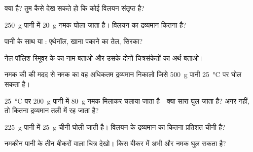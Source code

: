 \begin{exercise}[$\star$]\label{exo:g6:solutions-and-solubility:2}
 क्या है? तुम कैसे देख सकते हो कि कोई विलयन
संतृप्त है?
\end{exercise}

\begin{exercise}[$\star$]\label{exo:g6:solutions-and-solubility:3}
\qty{250}{g} पानी में \qty{20}{g} नमक घोला जाता है। विलयन का
द्रव्यमान कितना है?
\end{exercise}

\begin{exercise}[$\star$]\label{exo:g6:solutions-and-solubility:4}
पानी के साथ  या : एथेनॉल, खाना पकाने का तेल, सिरका?
\end{exercise}

\begin{exercise}[$\star$]\label{exo:g6:solutions-and-solubility:5}
नेल पॉलिश रिमूवर के  का नाम बताओ और उसके दोनों चित्रसंकेतों का
अर्थ बताओ।
\end{exercise}

\begin{exercise}[$\star\star$]\label{exo:g6:solutions-and-solubility:6}
नमक की  की मदद से नमक का वह अधिकतम द्रव्यमान निकालो जिसे
\qty{500}{g} पानी \qty{25}{\celsius} पर घोल सकता है।
\end{exercise}

\begin{exercise}[$\star\star$]\label{exo:g6:solutions-and-solubility:7}
\qty{25}{\celsius} पर \qty{200}{g} पानी में \qty{80}{g} नमक मिलाकर
चलाया जाता है। क्या सारा घुल जाता है? अगर नहीं, तो कितना द्रव्यमान तली में
रह जाता है?
\end{exercise}

\begin{exercise}[$\star\star$]\label{exo:g6:solutions-and-solubility:8}
\qty{225}{g} पानी में \qty{25}{g} चीनी घोली जाती है। विलयन के
द्रव्यमान का कितना प्रतिशत चीनी है?
\end{exercise}

\begin{exercise}[$\star\star$]\label{exo:g6:solutions-and-solubility:9}
नमकीन पानी के तीन बीकरों वाला चित्र देखो। किस बीकर में अभी और नमक
घुल सकता है?
\end{exercise}

